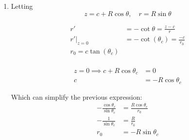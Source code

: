 \documentclass{X:/Documents/Coding/Latex/myassignment}
\begin{document}
\begin{enumerate}
\begin{enumerate}
	\item Letting
	\[z = c+R\cos\theta, \quad r = R\sin \theta\]
	
	\begin{align*}
		r' &= -\cot\theta = \frac{z-c}{r}\\
		r'|_{z=0} &= -\cot(\theta_c) = \frac{-c}{r_0}\\
		r_0 = c\tan(\theta_c)\\
	\end{align*}

	\begin{align*}
		z = 0 \implies c + R\cos\theta_c &= 0\\
		c &= - R\cos\theta_c
	\end{align*}

	Which can simplify the previous expression:
	\begin{align*}
		-\frac{\cos\theta_c}{\sin\theta_c} &= \frac{R\cos\theta_c}{r_0}\\
		-\frac{1}{\sin\theta_c} &= \frac{R}{r_0}\\
		r_0 &= - R\sin\theta_c
	\end{align*}




\end{enumerate}
\end{enumerate}
\end{document}
